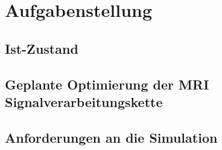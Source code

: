 \chapter{Aufgabenstellung}

\section{Ist-Zustand}

\section{Geplante Optimierung der MRI Signalverarbeitungskette}

\section{Anforderungen an die Simulation}